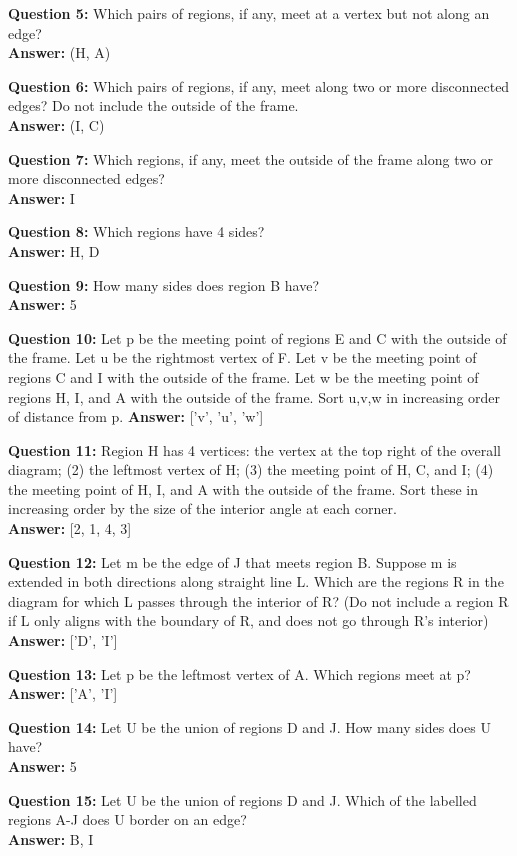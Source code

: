 \documentclass{article}    %
\begin{document}
{\bf Question 5:}
Which pairs of regions, if any, meet at a vertex but not along an edge? \\
{\bf Answer:}
{(H, A)}

{\bf Question 6:}
Which pairs of regions, if any, meet along two or more disconnected edges? Do not include the outside of the frame. \\
{\bf Answer:}
{(I, C)}

{\bf Question 7:}
Which regions, if any, meet the outside of the frame along two or more disconnected edges? \\
{\bf Answer:}
{I}

{\bf Question 8:}
Which regions have 4 sides? \\
{\bf Answer:}
{H, D}

{\bf Question 9:}
How many sides does region B have? \\
{\bf Answer:}
5

{\bf Question 10:}
Let p be the meeting point of regions E and C with the outside of the frame. Let u be the rightmost vertex of F. Let v be the meeting point of regions C and I with the outside of the frame. Let w be the meeting point of regions H, I, and A with the outside of the frame.  Sort u,v,w in increasing order of distance from p.
{\bf Answer:}
['v', 'u', 'w']

{\bf Question 11:}
Region H has 4 vertices:  the vertex at the top right of the overall diagram; (2) the leftmost vertex of H; (3) the meeting point of H, C, and I; (4) the meeting point of H, I, and A with the outside of the frame. Sort these in increasing order by the size of the interior angle at each corner. \\
{\bf Answer:}
[2, 1, 4, 3]

{\bf Question 12:}
Let m be the edge of J that meets region B. Suppose m is extended in both directions along straight line L. Which are the regions R in the diagram for which L passes through the interior of R? (Do not include a region R if L only aligns with the boundary of R, and does not go through R's interior) \\
{\bf Answer:}
['D', 'I']

{\bf Question 13:}
Let p be the leftmost vertex of A. Which regions meet at p? \\
{\bf Answer:}
['A', 'I']

{\bf Question 14:}
Let U be the union of regions D and J. How many sides does U have? \\
{\bf Answer:}
5

{\bf Question 15:}
Let U be the union of regions D and J. Which of the labelled regions A-J does U border on an edge? \\
{\bf Answer:}
{B, I}
\end{document}

